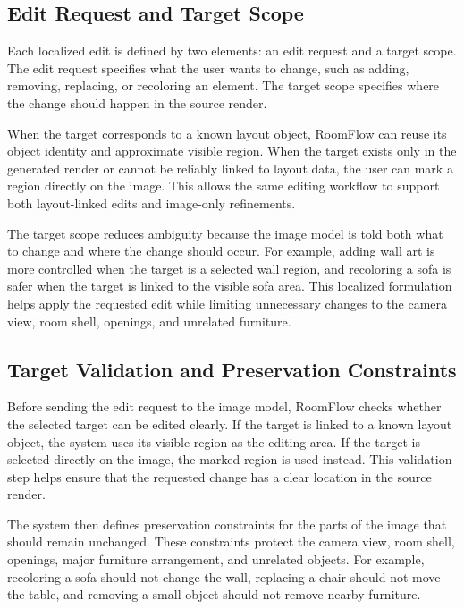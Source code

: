\subsection{Edit Request and Target Scope}\label{subsec:problem2-edit-target-scope}

Each localized edit is defined by two elements: an edit request and a target scope. The edit request specifies what the user wants to change, such as adding, removing, replacing, or recoloring an element. The target scope specifies where the change should happen in the source render.

When the target corresponds to a known layout object, RoomFlow can reuse its object identity and approximate visible region. When the target exists only in the generated render or cannot be reliably linked to layout data, the user can mark a region directly on the image. This allows the same editing workflow to support both layout-linked edits and image-only refinements.

The target scope reduces ambiguity because the image model is told both what to change and where the change should occur. For example, adding wall art is more controlled when the target is a selected wall region, and recoloring a sofa is safer when the target is linked to the visible sofa area. This localized formulation helps apply the requested edit while limiting unnecessary changes to the camera view, room shell, openings, and unrelated furniture.

\subsection{Target Validation and Preservation Constraints}\label{subsec:problem2-edit-preflight}

Before sending the edit request to the image model, RoomFlow checks whether the selected target can be edited clearly. If the target is linked to a known layout object, the system uses its visible region as the editing area. If the target is selected directly on the image, the marked region is used instead. This validation step helps ensure that the requested change has a clear location in the source render.

The system then defines preservation constraints for the parts of the image that should remain unchanged. These constraints protect the camera view, room shell, openings, major furniture arrangement, and unrelated objects. For example, recoloring a sofa should not change the wall, replacing a chair should not move the table, and removing a small object should not remove nearby furniture.

